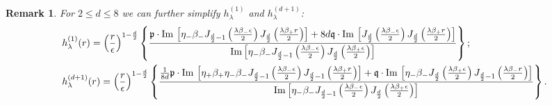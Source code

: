 \documentclass[11pt,a4paper,english,reqno]{amsart}
\theoremstyle{plain}
\newtheorem{remark}[definition]{Remark}
\newcommand{\e}{\epsilon}
\newcommand{\1}{\mathbbm{1}}
\begin{document}
\begin{remark}
For $2\leq d \leq 8$ we can further simplify $h^{(1)}_\lambda$ and $h^{(d+1)}_\lambda$:
\begin{eqnarray*}
&h^{(1)}_\lambda(r) = \left(\frac{r}{\e}\right)^{1-\frac{d}{2}} \left\{ \frac{\mathfrak{p}\cdot  {\rm Im}\,\left[\eta_-\beta_-J_{\frac{d}{2}-1}\left(\frac{\lambda\beta_-\e}{2}\right)J_{\frac{d}{2}}\left(\frac{\lambda\beta_+r}{2}\right)\right]  +8d\mathfrak{q}\cdot {\rm Im}\,\left[J_{\frac{d}{2}}\left(\frac{\lambda\beta_-\e}{2}\right)J_{\frac{d}{2}}\left(\frac{\lambda\beta_+ r}{2}\right)\right] }{{\rm Im}\left[\eta_-\beta_-J_{\frac{d}{2}-1}\left(\frac{\lambda\beta_-\e}{2}\right) J_{\frac{d}{2}}\left(\frac{\lambda\beta_+\e}{2}\right) \right]}\right\};\\
&h^{(d+1)}_\lambda(r) =\left(\frac{r}{\e}\right)^{1-\frac{d}{2}} \left\{ \frac{\frac{1}{8d}\mathfrak{p}\cdot  {\rm Im}\,\left[\eta_{+}\beta_{+}\eta_-\beta_-J_{\frac{d}{2}-1}\left(\frac{\lambda\beta_-\e}{2}\right)J_{\frac{d}{2}-1}\left(\frac{\lambda\beta_+r}{2}\right)\right]  +\mathfrak{q}\cdot {\rm Im}\,\left[ \eta_{-}\beta_{-}J_{\frac{d}{2}}\left(\frac{\lambda\beta_+\e}{2}\right)J_{\frac{d}{2}-1}\left(\frac{\lambda\beta_- r}{2}\right)\right] }{{\rm Im}\left[\eta_-\beta_-J_{\frac{d}{2}-1}\left(\frac{\lambda\beta_-\e}{2}\right) J_{\frac{d}{2}}\left(\frac{\lambda\beta_+\e}{2}\right) \right]}\right\}.
\end{eqnarray*}
\end{remark}
\end{document}
